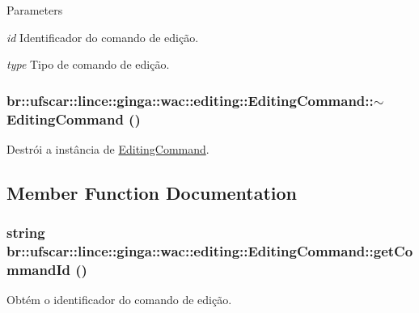 \begin{DoxyParams}{Parameters}
\item[{\em id}]Identificador do comando de edição. \item[{\em type}]Tipo de comando de edição. \end{DoxyParams}
\hypertarget{classbr_1_1ufscar_1_1lince_1_1ginga_1_1wac_1_1editing_1_1EditingCommand_ae96e746c3c5c3ac988f6ede8912ccb33}{
\subsubsection[{$\sim$EditingCommand}]{\setlength{\rightskip}{0pt plus 5cm}br::ufscar::lince::ginga::wac::editing::EditingCommand::$\sim$EditingCommand ()}}
\label{classbr_1_1ufscar_1_1lince_1_1ginga_1_1wac_1_1editing_1_1EditingCommand_ae96e746c3c5c3ac988f6ede8912ccb33}


Destrói a instância de \hyperlink{classbr_1_1ufscar_1_1lince_1_1ginga_1_1wac_1_1editing_1_1EditingCommand}{EditingCommand}. 



\subsection{Member Function Documentation}
\hypertarget{classbr_1_1ufscar_1_1lince_1_1ginga_1_1wac_1_1editing_1_1EditingCommand_a014a96ee0631de12234767798f8662c7}{
\subsubsection[{getCommandId}]{\setlength{\rightskip}{0pt plus 5cm}string br::ufscar::lince::ginga::wac::editing::EditingCommand::getCommandId ()}}
\label{classbr_1_1ufscar_1_1lince_1_1ginga_1_1wac_1_1editing_1_1EditingCommand_a014a96ee0631de12234767798f8662c7}


Obtém o identificador do comando de edição. 

